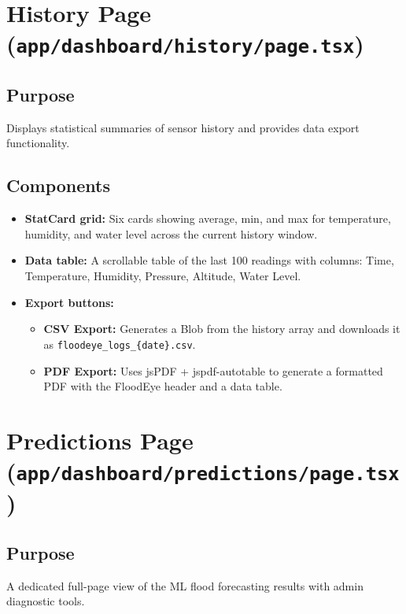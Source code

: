 \section{History Page (\texttt{app/\allowbreak{}dashboard/\allowbreak{}history/\allowbreak{}page.\allowbreak{}tsx})}

\subsection{Purpose}
Displays statistical summaries of sensor history and provides data export functionality.

\subsection{Components}
\begin{itemize}[leftmargin=1.5em]
  \item \textbf{StatCard grid:} Six cards showing average, min, and max for temperature, humidity, and water level across the current history window.
  \item \textbf{Data table:} A scrollable table of the last 100 readings with columns: Time, Temperature, Humidity, Pressure, Altitude, Water Level.
  \item \textbf{Export buttons:}
    \begin{itemize}
      \item \textbf{CSV Export:} Generates a Blob from the history array and downloads it as \texttt{floodeye\_\allowbreak{}logs\_\allowbreak{}\{date\}.csv}.
      \item \textbf{PDF Export:} Uses jsPDF + jspdf-autotable to generate a formatted PDF with the FloodEye header and a data table.
    \end{itemize}
\end{itemize}

\section{Predictions Page (\texttt{app/\allowbreak{}dashboard/\allowbreak{}predictions/\allowbreak{}page.\allowbreak{}tsx})}

\subsection{Purpose}
A dedicated full-page view of the ML flood forecasting results with admin diagnostic tools.

